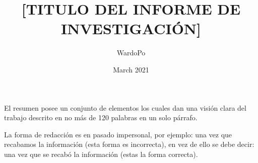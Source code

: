 \documentclass[12]{plan_tesis}
\title{[TITULO DEL  INFORME DE INVESTIGACIÓN]}
\author{WardoPo}
\date{March 2021}
\begin{document}


\begin{resumen}
El resumen posee un conjunto de elementos los cuales dan una visión clara del trabajo descrito en no más de 120 palabras en un solo párrafo.  

La forma de redacción es en pasado impersonal, por ejemplo: una vez que recabamos la información (esta forma es incorrecta), en vez de ello se debe decir: una vez que se recabó la información (estas la forma correcta).  
\end{resumen}









\end{document}
